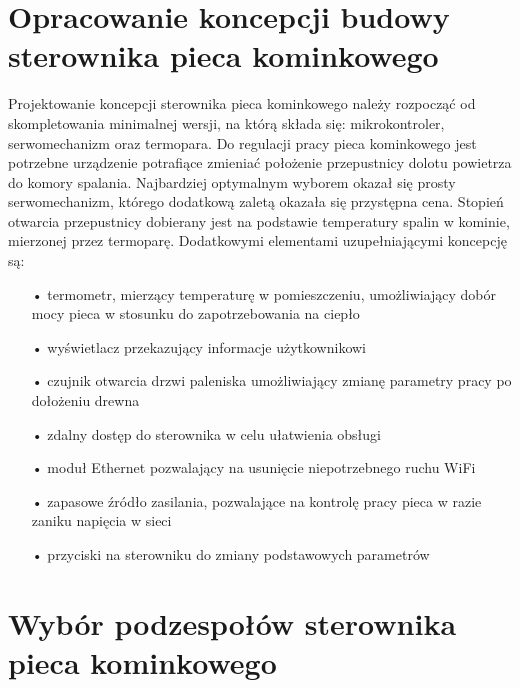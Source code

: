 \documentclass[11pt]{report}
\begin{document}
 \chapter[Opracowanie koncepcji budowy sterownika pieca...]{Opracowanie koncepcji budowy sterownika pieca kominkowego}\label{ch:koncepcja}
 Projektowanie koncepcji sterownika pieca kominkowego należy rozpocząć od skompletowania minimalnej wersji, na którą składa się: mikrokontroler, serwomechanizm oraz termopara. Do regulacji pracy pieca kominkowego jest potrzebne urządzenie potrafiące zmieniać położenie przepustnicy dolotu powietrza do komory spalania. Najbardziej optymalnym wyborem okazał się prosty serwomechanizm, którego dodatkową zaletą okazała się przystępna cena. Stopień otwarcia przepustnicy dobierany jest na podstawie temperatury spalin w kominie, mierzonej przez termoparę.
 Dodatkowymi elementami uzupełniającymi koncepcję są:
 \begin{enumerate}
 \item[•] termometr, mierzący temperaturę w pomieszczeniu, umożliwiający dobór mocy pieca w stosunku do zapotrzebowania na ciepło
 \item[•] wyświetlacz przekazujący informacje użytkownikowi
 \item[•] czujnik otwarcia drzwi paleniska umożliwiający zmianę parametry pracy po dołożeniu drewna
 \item[•] zdalny dostęp do sterownika w celu ułatwienia obsługi
 \item[•] moduł Ethernet pozwalający na usunięcie niepotrzebnego ruchu WiFi
 \item[•] zapasowe źródło zasilania, pozwalające na kontrolę pracy pieca w razie zaniku napięcia w sieci
 \item[•] przyciski na sterowniku do zmiany podstawowych parametrów
 \end{enumerate}  
 
  
 \chapter{Wybór podzespołów sterownika pieca kominkowego}\label{ch:wybor}
\end{document}

